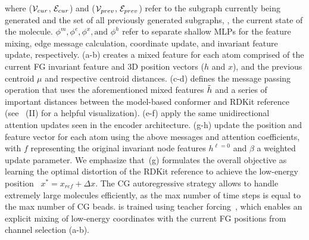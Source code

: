 where (${\mathcal{V}}_{cur}$, ${\mathcal{E}}_{cur}$) and (${\mathcal{V}}_{prev}$, ${\mathcal{E}}_{prev}$) refer to the subgraph currently being generated and the set of all previously generated subgraphs, \ie, the current state of the molecule. $\phi^m, \phi^e, \phi^x, \text{and } \phi^h$ refer to separate shallow MLPs for the feature mixing, edge message calculation, coordinate update, and invariant feature update, respectively. (a-b) creates a mixed feature for each atom comprised of the current FG invariant feature and 3D position vectors ($h$ and $x$), and the previous centroid $\mu$ and respective centroid distances. (c-d) defines the message passing operation that uses the aforementioned mixed features $\Tilde{h}$ and a series of important distances between the model-based conformer and RDKit reference (see~ (II) for a helpful visualization). (e-f) apply the same unidirectional attention updates seen in the encoder architecture. (g-h) update the position and feature vector for each atom using the above messages and attention coefficients, with $f$ representing the original invariant node features $h^{\ell=0}$ and $\beta$ a weighted update parameter. We emphasize that~(g) formulates the overall objective as learning the optimal distortion of the RDKit reference to achieve the low-energy position \ie\ $x^* = x_{ref} + \Delta x$.
The CG autoregressive strategy allows \model to handle extremely large molecules efficiently, as the max number of time steps is equal to the max number of CG beads. \model is trained using teacher forcing~\citep{teacher-forcing}, which enables an explicit mixing of low-energy coordinates with the current FG positions from channel selection (a-b).

\vspace{-2ex}